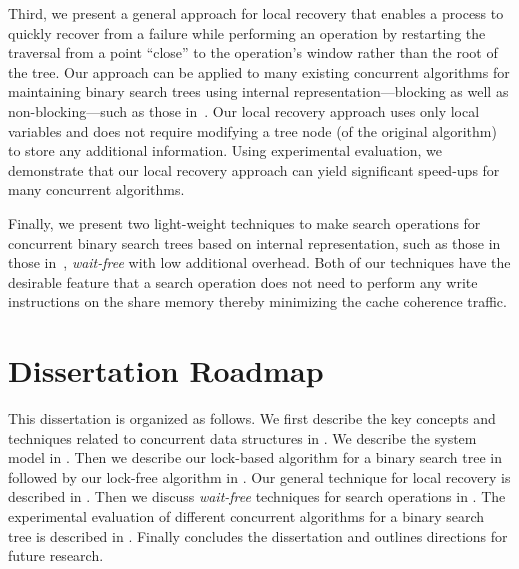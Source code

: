 Third, we present a general approach for local recovery that enables a process to quickly recover from a failure while performing an operation by restarting the traversal from a point ``close'' to the operation's window rather than the root of the tree.  Our approach can be applied to many existing concurrent algorithms for maintaining binary search trees using internal representation---blocking as well as non-blocking---such as those in~\cite{HowJon:2012:SPAA,DraVec+:2014:PPoPP,ArbAtt:2014:PODC,RamMit:2015:PPoPP}. Our local recovery approach uses only local variables and does not require modifying a tree node (of the original algorithm) to store any additional information. Using experimental evaluation, we demonstrate that our local recovery approach can yield significant speed-ups for many concurrent algorithms.

Finally, we present two light-weight techniques to make search operations for concurrent binary search trees based on internal representation, such as those in those in~\cite{HowJon:2012:SPAA,DraVec+:2014:PPoPP,ArbAtt:2014:PODC,RamMit:2015:ICDCN,RamMit:2015:PPoPP}, \emph{wait-free} with low additional overhead. Both of our techniques have the desirable feature that a search operation does not need to perform any write instructions on the share memory thereby minimizing the cache coherence traffic.

\section{Dissertation Roadmap} 
This dissertation is organized as follows. We first describe the key concepts and techniques related to concurrent data structures in \chapterref{\preliminaries}. We describe the system model in . Then we describe our lock-based algorithm for a binary search tree in  followed by our lock-free algorithm in . Our general technique for local recovery is described in . Then we discuss \emph{wait-free} techniques for search operations in . The experimental evaluation of different concurrent algorithms for a binary search tree is described in . Finally  concludes the dissertation and outlines directions for future research.
